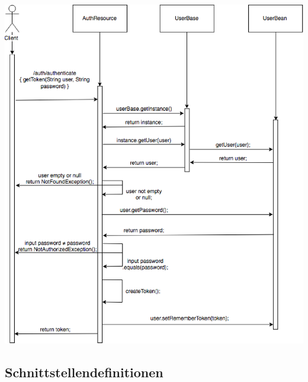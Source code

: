 \documentclass[german]{book}
\begin{document}
\includegraphics[scale=0.6]{auth-process.eps}


\newpage
\subsection{Schnittstellendefinitionen}
\end{document}
